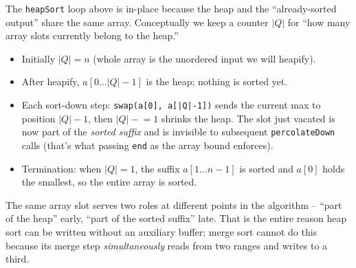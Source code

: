 \documentclass[11pt]{article}
\begin{document}
\begin{notebox}
The \texttt{heapSort} loop above is in-place because the heap and the
``already-sorted output'' share the same array. Conceptually we keep a
counter $|Q|$ for ``how many array slots currently belong to the
heap.''

\begin{itemize}[leftmargin=*]
    \item Initially $|Q| = n$ (whole array is the unordered input we
          will heapify).
    \item After heapify, $a[0 \ldots |Q|-1]$ is the heap; nothing is
          sorted yet.
    \item Each sort-down step: \texttt{swap(a[0], a[|Q|-1])} sends the
          current max to position $|Q|-1$, then $|Q| \mathrel{-}= 1$
          shrinks the heap. The slot just vacated is now part of the
          \emph{sorted suffix} and is invisible to subsequent
          \texttt{percolateDown} calls (that's what passing
          \texttt{end} as the array bound enforces).
    \item Termination: when $|Q| = 1$, the suffix $a[1 \ldots n-1]$ is
          sorted and $a[0]$ holds the smallest, so the entire array is
          sorted.
\end{itemize}

The same array slot serves two roles at different points in the
algorithm -- ``part of the heap'' early, ``part of the sorted suffix''
late. That is the entire reason heap sort can be written without an
auxiliary buffer; merge sort cannot do this because its merge step
\emph{simultaneously} reads from two ranges and writes to a third.
\end{notebox}
\end{document}
